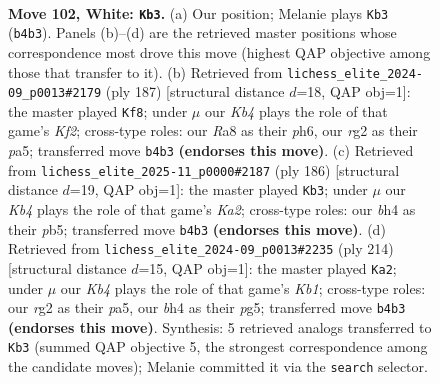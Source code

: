 \documentclass[11pt]{article}
\begin{document}
\clearpage

\begin{figure}[p]\centering
\begin{subfigure}{0.46\textwidth}\centering
\resizebox{\linewidth}{!}{%
\newchessgame
\chessboard[
  setfen={R7/7n/7p/4p2k/1K5b/3p4/6r1/8 w - - 0 102},
  showmover=false,
  pgfstyle=straightmove, color=movearrow, markmove={b4-b3}
]}
\caption{}
\end{subfigure}\hfill
\begin{subfigure}{0.46\textwidth}\centering
\resizebox{\linewidth}{!}{%
\newchessgame
\chessboard[
  setfen={8/5k2/7P/P5P1/8/5PK1/6N1/r7 b - - 0 94},
  showmover=false,
  pgfstyle=straightmove, color=movearrow, markmove={f7-f8}
]}
\caption{}
\end{subfigure}
\\[4pt]
\begin{subfigure}{0.46\textwidth}\centering
\resizebox{\linewidth}{!}{%
\newchessgame
\chessboard[
  setfen={8/7R/8/1pkp4/6r1/8/K7/8 w - - 2 94},
  showmover=false,
  pgfstyle=straightmove, color=movearrow, markmove={a2-b3}
]}
\caption{}
\end{subfigure}\hfill
\begin{subfigure}{0.46\textwidth}\centering
\resizebox{\linewidth}{!}{%
\newchessgame
\chessboard[
  setfen={5b2/8/6k1/pp4pp/8/8/8/1K6 w - - 6 108},
  showmover=false,
  pgfstyle=straightmove, color=movearrow, markmove={b1-a2}
]}
\caption{}
\end{subfigure}
\caption{\textbf{Move 102, White: \texttt{Kb3}.} (a) Our position; Melanie plays \texttt{Kb3} (\texttt{b4b3}). Panels (b)--(d) are the retrieved master positions whose correspondence most drove this move (highest QAP objective among those that transfer to it). (b) Retrieved from \texttt{lichess\_elite\_2024-09\_p0013\#2179} (ply 187) [structural distance $d$=18, QAP obj=1]: the master played \texttt{Kf8}; under $\mu$ our \emph{Kb4} plays the role of that game's \emph{Kf2}; cross-type roles: our \emph{R}a8 as their \emph{p}h6, our \emph{r}g2 as their \emph{p}a5; transferred move \texttt{b4b3} \textbf{(endorses this move)}. (c) Retrieved from \texttt{lichess\_elite\_2025-11\_p0000\#2187} (ply 186) [structural distance $d$=19, QAP obj=1]: the master played \texttt{Kb3}; under $\mu$ our \emph{Kb4} plays the role of that game's \emph{Ka2}; cross-type roles: our \emph{b}h4 as their \emph{p}b5; transferred move \texttt{b4b3} \textbf{(endorses this move)}. (d) Retrieved from \texttt{lichess\_elite\_2024-09\_p0013\#2235} (ply 214) [structural distance $d$=15, QAP obj=1]: the master played \texttt{Ka2}; under $\mu$ our \emph{Kb4} plays the role of that game's \emph{Kb1}; cross-type roles: our \emph{r}g2 as their \emph{p}a5, our \emph{b}h4 as their \emph{p}g5; transferred move \texttt{b4b3} \textbf{(endorses this move)}. Synthesis: 5 retrieved analogs transferred to \texttt{Kb3} (summed QAP objective 5, the strongest correspondence among the candidate moves); Melanie committed it via the \texttt{search} selector.}
\label{fig:thought-m202}
\end{figure}
\end{document}
